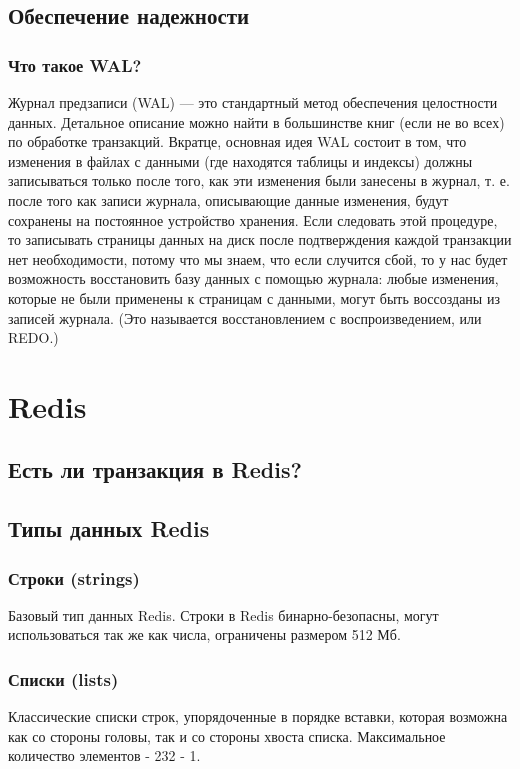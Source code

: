 \section{Обеспечение надежности}
\subsection{Что такое WAL?}
Журнал предзаписи (WAL) — это стандартный метод обеспечения целостности данных. Детальное описание можно найти в большинстве книг (если не во всех) по обработке транзакций. Вкратце, основная идея WAL состоит в том, что изменения в файлах с данными (где находятся таблицы и индексы) должны записываться только после того, как эти изменения были занесены в журнал, т. е. после того как записи журнала, описывающие данные изменения, будут сохранены на постоянное устройство хранения. Если следовать этой процедуре, то записывать страницы данных на диск после подтверждения каждой транзакции нет необходимости, потому что мы знаем, что если случится сбой, то у нас будет возможность восстановить базу данных с помощью журнала: любые изменения, которые не были применены к страницам с данными, могут быть воссозданы из записей журнала. (Это называется восстановлением с воспроизведением, или REDO.)


\chapter{Redis}

\section{Есть ли транзакция в Redis?}
\section{Типы данных Redis}
\subsection{Строки (strings)}
Базовый тип данных Redis. Строки в Redis бинарно-безопасны, могут использоваться так же как числа, ограничены размером 512 Мб.
\subsection{Списки (lists)}
Классические списки строк, упорядоченные в порядке вставки, которая возможна как со стороны головы, так и со стороны хвоста списка. Максимальное количество элементов - 232 - 1.
